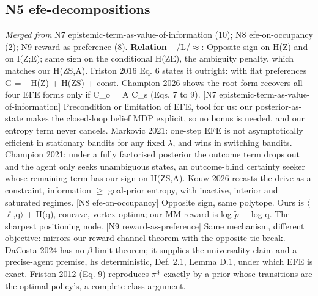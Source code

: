 \documentclass[10pt]{article}
\begin{document}
\subsection{N5 efe-decompositions}\label{node:S3-N5-efe-decompositions}
\textit{Merged from} N7 epistemic-term-as-value-of-information (10); N8 efe-on-occupancy (2); N9 reward-as-preference (8). \textbf{Relation} $-$/\textsf{L}/$\approx$: Opposite sign on H(Z) and on I(Z;E); same sign on the conditional H(Z\textbar{}E), the ambiguity penalty, which matches our H(Z\textbar{}S,A). Friston 2016 Eq. 6 states it outright: with flat preferences G = \ensuremath{-}H(Z) + H(Z\textbar{}S) + const. Champion 2026 shows the root form recovers all four EFE forms only if C\_o = A C\_s (Eqs. 7 to 9). [N7 epistemic-term-as-value-of-information] Precondition or limitation of EFE, tool for us: our posterior-as-state makes the closed-loop belief MDP explicit, so no bonus is needed, and our entropy term never cancels. Markovic 2021: one-step EFE is not asymptotically efficient in stationary bandits for any fixed \ensuremath{\lambda}, and wins in switching bandits. Champion 2021: under a fully factorised posterior the outcome term drops out and the agent only seeks unambiguous states, an outcome-blind certainty seeker whose remaining term has our sign on H(Z\textbar{}S,A). Kouw 2026 recasts the drive as a constraint, information \ensuremath{\geq} goal-prior entropy, with inactive, interior and saturated regimes. [N8 efe-on-occupancy] Opposite sign, same polytope. Ours is \ensuremath{\langle}\ensuremath{\ell},q\ensuremath{\rangle} + H(q), concave, vertex optima; our MM reward is log \ensuremath{\tilde{p}} + log q. The sharpest positioning node. [N9 reward-as-preference] Same mechanism, different objective: mirrors our reward-channel theorem with the opposite tie-break. DaCosta 2024 has no \ensuremath{\beta}-limit theorem; it supplies the universality claim and a precise-agent premise, h\textbar{}s deterministic, Def. 2.1, Lemma D.1, under which EFE is exact. Friston 2012 (Eq. 9) reproduces \ensuremath{\pi}* exactly by a prior whose transitions are the optimal policy's, a complete-class argument.
\end{document}
